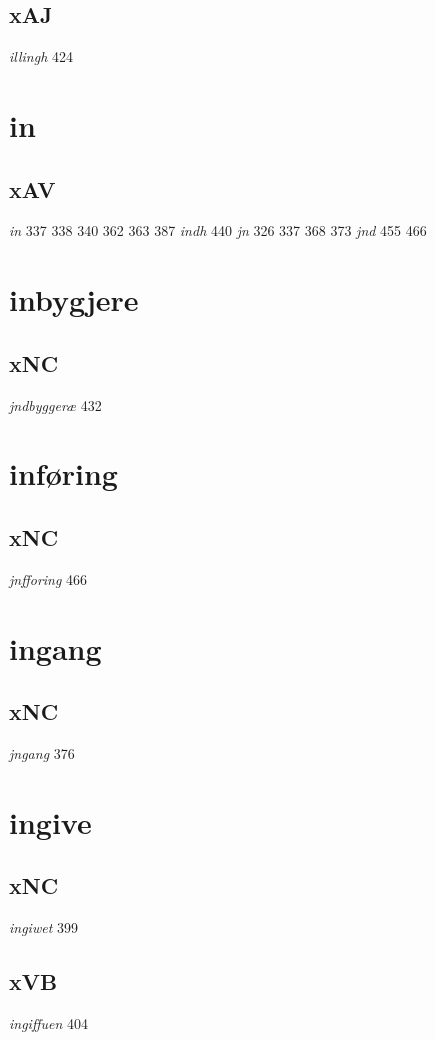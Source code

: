 \documentclass[a4paper,twocolumn]{article}
\begin{document}
\subsection{xAJ}
\label{sec:org763027e}
\emph{illingh} 424 
\section{in}
\label{sec:org5372c5e}
\subsection{xAV}
\label{sec:orgb8e020c}
\emph{in} 337 338 340 362 363 387 \emph{indh} 440 \emph{jn} 326 337 368 373 \emph{jnd} 455 466 
\section{inbygjere}
\label{sec:org3ee5cbb}
\subsection{xNC}
\label{sec:org81e06ed}
\emph{jndbyggeræ} 432 
\section{inføring}
\label{sec:org4740ae4}
\subsection{xNC}
\label{sec:org6002ec2}
\emph{jnfforing} 466 
\section{ingang}
\label{sec:org51eea86}
\subsection{xNC}
\label{sec:org0bac177}
\emph{jngang} 376 
\section{ingive}
\label{sec:org59984c5}
\subsection{xNC}
\label{sec:orged62204}
\emph{ingiwet} 399 
\subsection{xVB}
\label{sec:org44d8dbd}
\emph{ingiffuen} 404 
\end{document}
